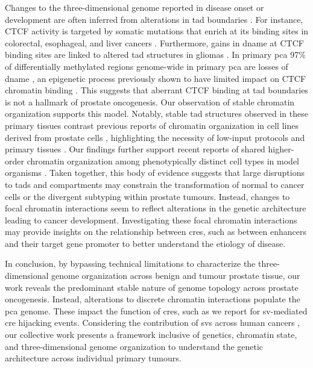 Changes to the three-dimensional genome reported in disease onset or development are often inferred from alterations in \gls{tad} boundaries \cite{oudelaarRelationshipGenomeStructure2020,akdemirDisruptionChromatinFolding2020}.
For instance, CTCF activity is targeted by somatic mutations that enrich at its binding sites in colorectal, esophageal, and liver cancers \cite{katainenCTCFCohesinbindingSites2015,guoMutationHotspotsCTCF2018}.
Furthermore, gains in \gls{dname} at CTCF binding sites are linked to altered \gls{tad} structures in gliomas \cite{flavahanInsulatorDysfunctionOncogene2016}.
In primary \gls{pca} 97\% of differentially methylated regions genome-wide in primary \gls{pca} are losses of \gls{dname} \cite{zhaoDNAMethylationLandscape2020,yuWholeGenomeMethylationSequencing2013}, an epigenetic process previously shown to have limited impact on CTCF chromatin binding \cite{mauranoRoleDNAMethylation2015}.
This suggests that aberrant CTCF binding at \gls{tad} boundaries is not a hallmark of prostate oncogenesis.
Our observation of stable chromatin organization supports this model.
Notably, stable \gls{tad} structures observed in these primary tissues contrast previous reports of chromatin organization in cell lines derived from prostate cells \cite{taberlayThreedimensionalDisorganizationCancer2016,rhieHighresolution3DEpigenomic2019}, highlighting the necessity of low-input protocols and primary tissues \cite{diazChromatinConformationAnalysis2018}.
Our findings further support recent reports of shared higher-order chromatin organization among phenotypically distinct cell types in model organisms \cite{rao3DMapHuman2014,dixonTopologicalDomainsMammalian2012,ing-simmonsIndependenceChromatinConformation2021,ghavi-helmHighlyRearrangedChromosomes2019,iyyankiSubtypeassociatedEpigenomicLandscape2021,akdemirDisruptionChromatinFolding2020}.
Taken together, this body of evidence suggests that large disruptions to \glspl{tad} and compartments may constrain the transformation of normal to cancer cells or the divergent subtyping within prostate tumours.
Instead, changes to focal chromatin interactions seem to reflect alterations in the genetic architecture leading to cancer development.
Investigating these focal chromatin interactions may provide insights on the relationship between \glspl{cre}, such as between enhancers and their target gene promoter \cite{gasperiniComprehensiveCatalogueValidated2020,nasserGenomewideEnhancerMaps2021} to better understand the etiology of disease.

In conclusion, by bypassing technical limitations to characterize the three-dimensional genome organization across benign and tumour prostate tissue, our work reveals the predominant stable nature of genome topology across prostate oncogenesis.
Instead, alterations to discrete chromatin interactions populate the \gls{pca} genome.
These impact the function of \glspl{cre}, such as we report for \gls{sv}-mediated \gls{cre} hijacking events.
Considering the contribution of \glspl{sv} across human cancers \cite{hanahanHallmarksCancerNext2011}, our collective work presents a framework inclusive of genetics, chromatin state, and three-dimensional genome organization to understand the genetic architecture across individual primary tumours.
